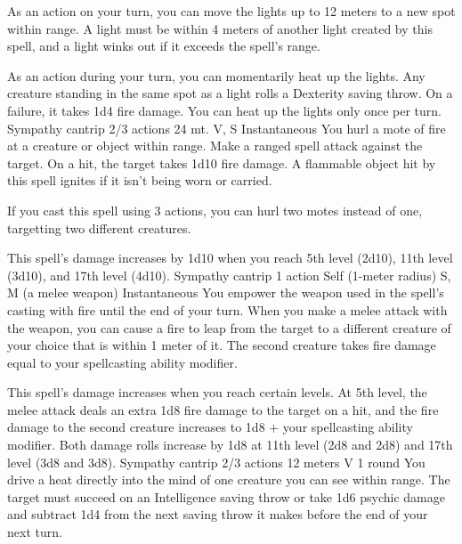         As an action on your turn, you can move the lights up to 12 meters to a new spot within range. A light must be within 4 meters of another light created by this spell, and a light winks out if it exceeds the spell's range.

        As an action during your turn, you can momentarily heat up the lights.
        Any creature standing in the same spot as a light rolls a Dexterity saving throw.
        On a failure, it takes 1d4 fire damage.
        You can heat up the lights only once per turn.
        {Sympathy cantrip}
        {2/3 actions}
        {24 mt.}
        {V, S}
        {Instantaneous}
        You hurl a mote of fire at a creature or object within range.
        Make a ranged spell attack against the target.
        On a hit, the target takes 1d10 fire damage.
        A flammable object hit by this spell ignites if it isn't being worn or carried.

        If you cast this spell using 3 actions, you can hurl two motes instead of one, targetting two different creatures.

        This spell's damage increases by 1d10 when you reach 5th level (2d10), 11th level (3d10), and 17th level (4d10).
        {Sympathy cantrip}
        {1 action}
        {Self (1-meter radius)}
        {S, M (a melee weapon)}
        {Instantaneous}
        You empower the weapon used in the spell's casting with fire until the end of your turn.
        When you make a melee attack with the weapon, you can cause a fire to leap from the target to a different creature of your choice that is within 1 meter of it.
        The second creature takes fire damage equal to your spellcasting ability modifier.

        This spell's damage increases when you reach certain levels.
        At 5th level, the melee attack deals an extra 1d8 fire damage to the target on a hit, and the fire damage to the second creature increases to 1d8 + your spellcasting ability modifier.
        Both damage rolls increase by 1d8 at 11th level (2d8 and 2d8) and 17th level (3d8 and 3d8).
        {Sympathy cantrip}
        {2/3 actions}
        {12 meters}
        {V}
        {1 round}
        You drive a heat directly into the mind of one creature you can see within range.
        The target must succeed on an Intelligence saving throw or take 1d6 psychic damage and subtract 1d4 from the next saving throw it makes before the end of your next turn.

